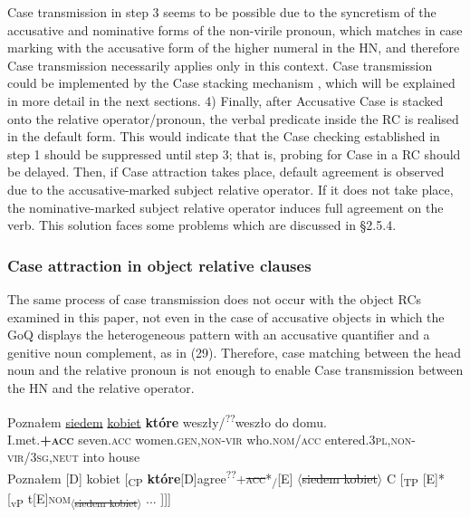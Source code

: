 \documentclass[output=paper]{langsci/langscibook}
\begin{document}
Case transmission in step 3 seems to be possible due to the syncretism of the accusative and nominative forms of the non-virile pronoun, which matches in case marking with the accusative form of the higher numeral in the HN, and therefore Case transmission necessarily applies only in this context. Case transmission could be implemented by the Case stacking mechanism \citep{Vogel2001}, which will be explained in more detail in the next sections. 4) Finally, after Accusative Case is stacked onto the relative operator\slash pronoun, the verbal predicate inside the RC is realised in the default form. This would indicate that the Case checking established in step 1 should be suppressed until step 3; that is, probing for Case in a RC should be delayed. Then, if Case attraction takes place, default agreement is observed due to the accusative-marked subject relative operator. If it does not take place, the nominative-marked subject relative operator induces full agreement on the verb. This solution faces some problems which are discussed in §2.5.4.

\subsubsection{Case attraction in object relative clauses}%

The same process of case transmission does not occur with the object RCs examined in this paper, not even in the case of accusative objects in which the GoQ displays the heterogeneous pattern with an accusative quantifier and a genitive noun complement, as in (29). Therefore, case matching between the head noun and the relative pronoun is not enough to enable Case transmission between the HN and the relative operator.

\ea\label{ex:leska:29}
\gll Poznałem \ul{siedem}     \ul{kobiet}     \textbf{które} weszły/\textsuperscript{??}weszło   do   domu.\\
     I.met.\textbf{\textsc{+acc}} seven.\textsc{acc}   women.\textsc{gen,non-vir}  who.\textsc{nom/acc}    entered.\textsc{3pl,non-vir/3sg,neut}  into house\\
\glt Poznałem [D] kobiet [\textsubscript{CP} \textbf{które}[D]{agree\textsuperscript{??}+\textsc{\st{acc}}}*\textsubscript{\slash}[E] $\langle$\st{siedem kobiet}$\rangle$ C [\textsubscript{TP} [E]* [\textsubscript{vP} t[E]{\footnotesize\textsc{nom}}\textsubscript{$\langle$\st{siedem kobiet}$\rangle$} ... ]]]
\z
\end{document}

